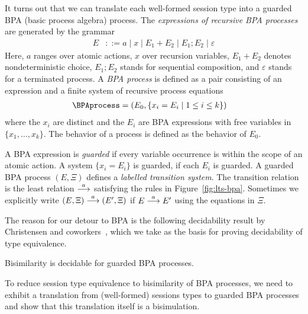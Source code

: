 It turns out that we can translate each well-formed session type into
a guarded BPA (basic process algebra) process. The \emph{expressions of recursive BPA
processes} \cite{DBLP:journals/jacm/BaetenBK93} are generated by the
grammar
\begin{align*}
  E &::= a \mid x \mid E_1 + E_2 \mid E_1;E_2 \mid \varepsilon
\end{align*}
Here, $a$ ranges over atomic actions, $x$ over recursion
variables, $E_1+E_2$ denotes nondeterministic choice, $E_1;E_2$
stands for sequential composition, and $\varepsilon$ stands for a terminated
process. A \emph{BPA process} is defined as a pair consisting of an expression and a 
finite system of recursive process equations
\begin{align*}
  \BPAprocess &= (E_0, \{ x_i = E_i \mid 1 \le i \le k \}) 
\end{align*}
where the $x_i$ are distinct and the $E_i$ are BPA expressions with
free variables in $\{x_1, \dots, x_k\}$. The behavior of a process is defined as the
behavior of $E_0$.




  A BPA expression is \emph{guarded} if every variable occurrence is
  within the scope of an atomic action. A system $\{ x_i = E_i \}$ is
  guarded, if each $E_i$  is guarded. 
%
  A guarded BPA process $(E, \Xi)$ defines a \emph{labelled transition
    system}. The transition relation is the least relation
  $\stackrel{a}{\longrightarrow}$ satisfying the rules in Figure~\ref{fig:lts-bpa}.
  Sometimes we explicitly write $(E, \Xi) \stackrel{a}{\longrightarrow} (E', \Xi)$ if
  $E \stackrel{a}{\longrightarrow} E'$ using the equations in $\Xi$.

The reason for our detour to BPA is the following decidability result
by Christensen and
coworkers~\cite{DBLP:journals/iandc/ChristensenHS95}, which we take as
the basis for proving decidability of type equivalence.

\begin{theorem}
  Bisimilarity is decidable for guarded BPA processes.
\end{theorem}

To reduce session type equivalence to bisimilarity of BPA processes,
we need to exhibit a translation from (well-formed) sessions types to
guarded BPA processes and show that this translation itself is a
bisimulation.


